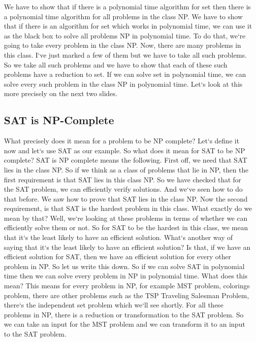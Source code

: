 We have to show that if there is a polynomial time algorithm for set then there is a polynomial time algorithm for all problems in the class NP\@.
We have to show that if there is an algorithm for set which works in polynomial time, we can use it as the black box to solve all problems NP in polynomial time.
To do that, we`re going to take every problem in the class NP\@.
Now, there are many problems in this class.
I`ve just marked a few of them but we have to take all such problems.
So we take all such problems and we have to show that each of these such problems have a reduction to set.
If we can solve set in polynomial time, we can solve every such problem in the class NP in polynomial time.
Let`s look at this more precisely on the next two slides.

\subsection{SAT is NP-Complete}
What precisely does it mean for a problem to be NP complete? Let`s define it now and let`s use SAT as our example.
So what does it mean for SAT to be NP complete? SAT is NP complete means the following.
First off, we need that SAT lies in the class NP\@.
So if we think as a class of problems that lie in NP, then the first requirement is that SAT lies in this class NP\@.
So we have checked that for the SAT problem, we can efficiently verify solutions.
And we`ve seen how to do that before.
We saw how to prove that SAT lies in the class NP\@.
Now the second requirement, is that SAT is the hardest problem in this class.
What exactly do we mean by that? Well, we`re looking at these problems in terms of whether we can efficiently solve them or not.
So for SAT to be the hardest in this class, we mean that it`s the least likely to have an efficient solution.
What`s another way of saying that it`s the least likely to have an efficient solution? Is that, if we have an efficient solution for SAT, then we have an efficient solution for every other problem in NP\@.
So let us write this down.
So if we can solve SAT in polynomial time then we can solve every problem in NP in polynomial time.
What does this mean? This means for every problem in NP, for example MST problem, colorings problem, there are other problems such as the TSP Traveling Salesman Problem, there`s the independent set problem which we`ll see shortly.
For all these problems in NP, there is a reduction or transformation to the SAT problem.
So we can take an input for the MST problem and we can transform it to an input to the SAT problem.
